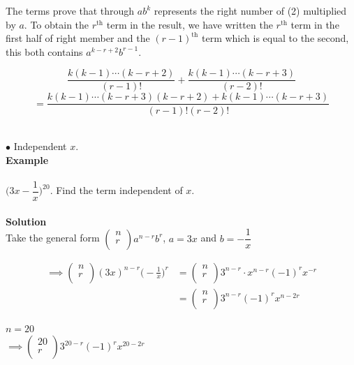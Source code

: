 \documentclass[11pt,a4paper]{article}
\begin{document}
\begin{enumerate}
The terms prove that through $ab^k$ represents the right number of (2) multiplied by $a$. To obtain the $r^{\text{th}}$ term in the result, we have written the $r^{\text{th}}$ term in the first half of right member and the $(r-1)^{\text{th}}$ term which is equal to the second, this both contains $a^{k-r+2}b^{r-1}$.

$$\frac{k(k-1)\cdots (k-r+2)}{(r-1)!}+\frac{k(k-1)\cdots(k-r+3)}{(r-2)!}$$
$$=\frac{k(k-1)\cdots(k-r+3)(k-r+2)+k(k-1)\cdots (k-r+3)}{(r-1)!(r-2)!}$$\\
\end{enumerate}

$\bullet$ Independent $x$.\\

\textbf{Example}\\\\
$\bigg(3x-\dfrac{1}{x}\bigg)^{20}$. Find the term independent of $x$.\\\\


\textbf{Solution}\\
Take the general form $
\begin{pmatrix}
n\\r\\
\end{pmatrix}
a^{n-r}b^r
$, \hspace{0.4cm} $a=3x$ and $b=-\dfrac{1}{x}$

\begin{align*}
\implies 
\begin{pmatrix}
n\\r\\
\end{pmatrix}
(3x)^{n-r}\bigg(-\frac{1}{x}\bigg)^r & = 
\begin{pmatrix}
n\\r\\
\end{pmatrix}
3^{n-r}\cdot x^{n-r}(-1)^r x^{-r}\\
& = 
\begin{pmatrix}
n\\r\\
\end{pmatrix}
3^{n-r}(-1)^r x^{n-2r}
\end{align*}

$n=20$\\

$\implies 
\begin{pmatrix}
20\\ r\\
\end{pmatrix}
3^{20-r}(-1)^rx^{20-2r}
$\\
\end{document}
